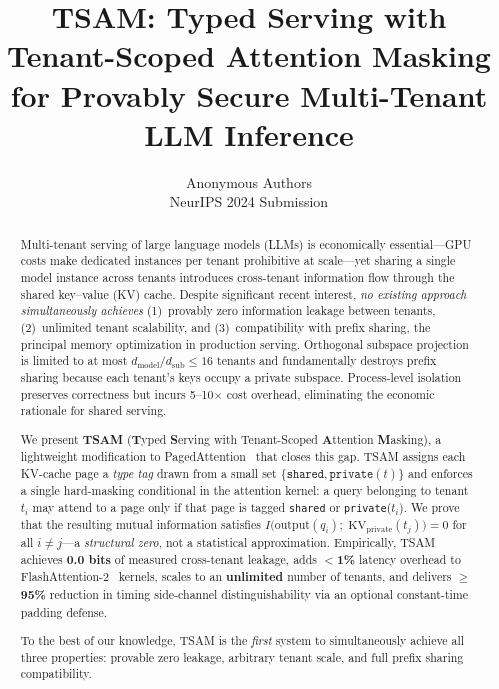 \documentclass[11pt]{article}
\title{TSAM: Typed Serving with Tenant-Scoped Attention Masking\\
for Provably Secure Multi-Tenant LLM Inference}
\author{Anonymous Authors\\NeurIPS 2024 Submission}
\begin{document}
\maketitle

\begin{abstract}
Multi-tenant serving of large language models (LLMs) is economically
essential---GPU costs make dedicated instances per tenant prohibitive at
scale---yet sharing a single model instance across tenants introduces
cross-tenant information flow through the shared key--value (KV) cache.
Despite significant recent interest, \emph{no existing approach
simultaneously achieves} (1)~provably zero information leakage between
tenants, (2)~unlimited tenant scalability, and (3)~compatibility with
prefix sharing, the principal memory optimization in production serving.
Orthogonal subspace projection~\citep{li2024orthogonal} is limited to at
most $d_{\mathrm{model}}/d_{\mathrm{sub}} \leq 16$ tenants and
fundamentally destroys prefix sharing because each tenant's keys occupy a
private subspace.  Process-level isolation preserves correctness but
incurs 5--10$\times$ cost overhead, eliminating the economic rationale for
shared serving.

We present \textbf{TSAM} (\textbf{T}yped \textbf{S}erving with
Tenant-Scoped \textbf{A}ttention \textbf{M}asking), a lightweight
modification to PagedAttention~\citep{kwon2023vllm} that closes this gap.
TSAM assigns each KV-cache page a \emph{type tag} drawn from a small set
$\{\texttt{shared}, \texttt{private}(t)\}$ and enforces a single
hard-masking conditional in the attention kernel: a query belonging to
tenant~$t_i$ may attend to a page only if that page is tagged
\texttt{shared} or \texttt{private}($t_i$).  We prove that the resulting
mutual information satisfies
$I\!\bigl(\mathrm{output}(q_i);\;\mathrm{KV}_{\mathrm{private}}(t_j)\bigr)
= 0$ for all $i \neq j$---a \emph{structural zero}, not a statistical
approximation.  Empirically, TSAM achieves \textbf{0.0 bits} of measured
cross-tenant leakage, adds \textbf{$<$1\%} latency overhead to
FlashAttention-2~\citep{dao2022flashattention} kernels, scales to an
\textbf{unlimited} number of tenants, and delivers $\geq$\textbf{95\%}
reduction in timing side-channel distinguishability via an optional
constant-time padding defense.

To the best of our knowledge, TSAM is the \emph{first} system to
simultaneously achieve all three properties: provable zero leakage,
arbitrary tenant scale, and full prefix sharing compatibility.
\end{abstract}
\end{document}
